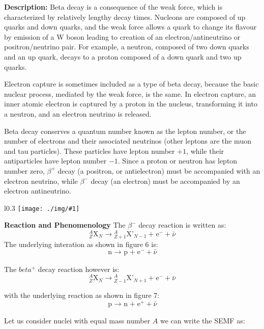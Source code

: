 \documentclass[10pt,a4paper]{article}
\newcounter{figurecounter}
\newcommand{\imgl}[3]{
    \begin{wrapfigure}{l}{#2\textwidth}
        \centering
        \captionsetup{justification=centering,margin=0cm,labelformat=empty}
        \texttt{[image: ./img/\#1]}
        \label{figure}
        \caption{\small \textbf{fig: \thefigurecounter} -- \textcolor{darkliver}{#3}}
    \end{wrapfigure}
    \addtocounter{figurecounter}{1}}
\newcommand{\ch}[5]{{}^{#2}_{#3}\!\text{#1}^{#4}_{#5}}
\begin{document}
\textbf{Description:} 
Beta decay is a consequence of the weak force, which is characterized by relatively lengthy decay times. Nucleons are composed of up quarks and down quarks, and the weak force allows a quark to change its flavour by emission of a W boson leading to creation of an electron/antineutrino or positron/neutrino pair. For example, a neutron, composed of two down quarks and an up quark, decays to a proton composed of a down quark and two up quarks.

Electron capture is sometimes included as a type of beta decay, because the basic nuclear process, mediated by the weak force, is the same. In electron capture, an inner atomic electron is captured by a proton in the nucleus, transforming it into a neutron, and an electron neutrino is released.

Beta decay conserves a quantum number known as the lepton number, or the number of electrons and their associated neutrinos (other leptons are the muon and tau particles). These particles have lepton number $+1$, while their antiparticles have lepton number $-1$. Since a proton or neutron has lepton number zero, $\beta^+$ decay (a positron, or antielectron) must be accompanied with an electron neutrino, while $\beta^-$ decay (an electron) must be accompanied by an electron antineutrino.

\imgl{betapositive}{0.3}{Feynman digram of the $\beta^+$ decay}
\textbf{Reaction and Phenomenology}
The $\beta^-$ decay reaction is written as:
\begin{equation}
    \ch{X}{A}{Z}{}{N} \rightarrow \ch{X'}{A}{Z+1}{}{N-1} + \ch{e}{}{}{-}{} + \bar\nu
\end{equation}
The underlying interation as shown in figure 6 is:
\begin{equation}
    \ch{n}{}{}{}{} \rightarrow \ch{p}{}{}{}{} + \ch{e}{}{}{-}{} + \bar\nu
\end{equation} 

The $beta^+$ decay reaction however is:
\begin{equation}
    \ch{X}{A}{Z}{}{N} \rightarrow \ch{X'}{A}{Z-1}{}{N+1} + \ch{e}{}{}{-}{} + \bar\nu
\end{equation}

with the underlying reaction as shown in figure 7:
\begin{equation}
    \ch{p}{}{}{}{} \rightarrow \ch{n}{}{}{}{} + \ch{e}{}{}{+}{} + \bar\nu
\end{equation} 

Let us consider nuclei with equal mass number $A$ we can write the SEMF as:
\end{document}
